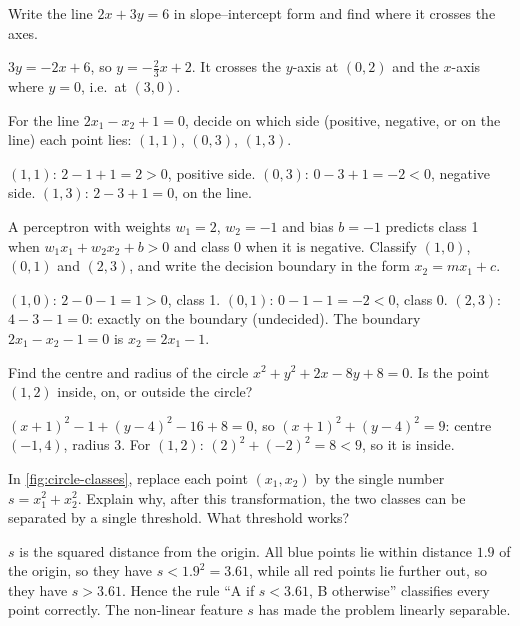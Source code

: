 \sectionexercises

\begin{exercise}
Write the line $2x + 3y = 6$ in slope--intercept form and find where it
crosses the axes.
\end{exercise}
\begin{solution}
$3y = -2x + 6$, so $y = -\tfrac23 x + 2$. It crosses the $y$-axis at $(0, 2)$
and the $x$-axis where $y = 0$, i.e.\ at $(3, 0)$.
\end{solution}

\begin{exercise}
For the line $2x_1 - x_2 + 1 = 0$, decide on which side (positive, negative,
or on the line) each point lies: $(1, 1)$, $(0, 3)$, $(1, 3)$.
\end{exercise}
\begin{solution}
$(1,1)$: $2 - 1 + 1 = 2 > 0$, positive side. $(0,3)$: $0 - 3 + 1 = -2 < 0$,
negative side. $(1,3)$: $2 - 3 + 1 = 0$, on the line.
\end{solution}

\begin{exercise}
A perceptron with weights $w_1 = 2$, $w_2 = -1$ and bias $b = -1$ predicts
class 1 when $w_1 x_1 + w_2 x_2 + b > 0$ and class 0 when it is negative.
Classify $(1, 0)$, $(0, 1)$ and $(2, 3)$, and write the decision boundary in
the form $x_2 = mx_1 + c$.
\end{exercise}
\begin{solution}
$(1,0)$: $2 - 0 - 1 = 1 > 0$, class 1. $(0,1)$: $0 - 1 - 1 = -2 < 0$, class 0.
$(2,3)$: $4 - 3 - 1 = 0$: exactly on the boundary (undecided). The boundary
$2x_1 - x_2 - 1 = 0$ is $x_2 = 2x_1 - 1$.
\end{solution}

\begin{exercise}
Find the centre and radius of the circle $x^2 + y^2 + 2x - 8y + 8 = 0$. Is the
point $(1, 2)$ inside, on, or outside the circle?
\end{exercise}
\begin{solution}
$(x + 1)^2 - 1 + (y - 4)^2 - 16 + 8 = 0$, so $(x+1)^2 + (y-4)^2 = 9$: centre
$(-1, 4)$, radius $3$. For $(1,2)$: $(2)^2 + (-2)^2 = 8 < 9$, so it is inside.
\end{solution}

\begin{exercise}
In \cref{fig:circle-classes}, replace each point $(x_1, x_2)$ by the single
number $s = x_1^2 + x_2^2$. Explain why, after this transformation, the two
classes can be separated by a single threshold. What threshold works?
\end{exercise}
\begin{solution}
$s$ is the squared distance from the origin. All blue points lie within
distance $1.9$ of the origin, so they have $s < 1.9^2 = 3.61$, while all red
points lie further out, so they have $s > 3.61$. Hence the rule ``A if
$s < 3.61$, B otherwise'' classifies every point correctly. The non-linear
feature $s$ has made the problem linearly separable.
\end{solution}

